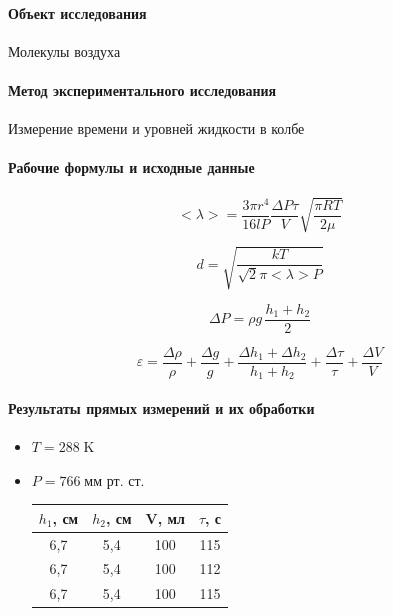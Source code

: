\documentclass{article}
\begin{document}
\paragraph{Объект исследования}
Молекулы воздуха

\paragraph{Метод экспериментального исследования}
Измерение времени и уровней жидкости в колбе

 \paragraph{Рабочие формулы и исходные данные}\hypertarget{formuls}{}
 \begin{equation}
 	<\lambda>=\frac{3\pi r^4}{16lP} \frac{\Delta P\tau}{V} \sqrt{\frac{\pi RT}{2\mu}}
 \end{equation}

\begin{equation}
	d=\sqrt{\frac{kT}{\sqrt{2}\pi <\lambda>P}}
\end{equation}

\begin{equation}
	\Delta P=\rho g\, \frac{h_1+h_2}{2}
\end{equation}

\begin{equation}
	\varepsilon=\frac{\Delta \rho}{\rho}+\frac{\Delta g}{g}+\frac{\Delta h_1+\Delta h_2}{h_1+h_2}+\frac{\Delta \tau}{\tau}+\frac{\Delta V}{V}
\end{equation}

\paragraph{Результаты прямых измерений и их обработки}
\begin{itemize}
	\item $T=288\;\mbox{K}$
	\item$P=766\;\mbox{мм рт. ст.}$
	\begin{table}[htb]
	\begin{tabular}{c|c|c|c}
		$h_1$,  см & $h_2$,  см & V,  мл & $\tau$,  с \\
		\hline
		6,7 & 5,4 & 100 & 115 \\
	
		6,7 & 5,4 & 100 & 112 \\
	
		6,7 & 5,4 & 100 & 115 \\
	\end{tabular}
\end{table}
\end{itemize}
\end{document}
